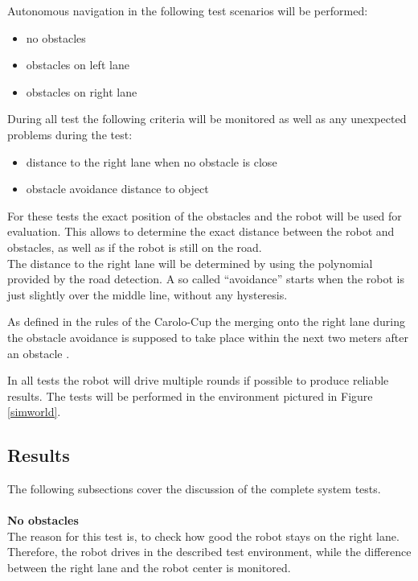 Autonomous navigation in the following test scenarios will be performed:

\begin{itemize}
	\item no obstacles
	\item obstacles on left lane
	\item obstacles on right lane
\end{itemize}

During all test the following criteria will be monitored as well as any unexpected problems during the test:

\begin{itemize}
	\item distance to the right lane when no obstacle is close
	\item obstacle avoidance distance to object
\end{itemize}

For these tests the exact position of the obstacles and the robot will be used for evaluation. This allows to determine the exact distance between the robot and obstacles, as well as if the robot is still on the road.\\
The distance to the right lane will be determined by using the polynomial provided by the road detection. A so called ``avoidance'' starts when the robot is just slightly over the middle line, without any hysteresis.

As defined in the rules of the Carolo-Cup the merging onto the right lane during the obstacle avoidance is supposed to take place within the next two meters after an obstacle \cite{carolocup}.

In all tests the robot will drive multiple rounds if possible to produce reliable results. The tests will be performed in the environment pictured in Figure \ref{simworld}.\\

\subsection{Results}
The following subsections cover the discussion of the complete system tests.\\\\
\textbf{No obstacles}\\
The reason for this test is, to check how good the robot stays on the right lane. Therefore, the robot drives in the described test environment, while the difference between the right lane and the robot center is monitored.

